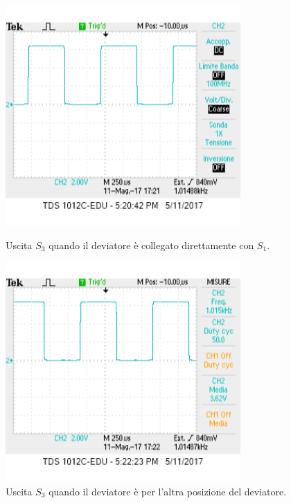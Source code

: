 \documentclass[a4paper,10pt]{article}
\begin{document}
\begin{figure}[H]
\begin{minipage}{0.49\textwidth}
	\centering
	\includegraphics[width=0.8\textwidth]{../grafici/s3_devposA.png}
	\caption{Uscita $S_3$ quando il deviatore è collegato direttamente con $S_1$.}
	\label{fig:3_devposA}
\end{minipage}
\begin{minipage}{0.49\textwidth}
	\centering
	\includegraphics[width=0.8\textwidth]{../grafici/s3_devposB.png}
	\caption{Uscita $S_3$ quando il deviatore è per l'altra posizione del deviatore.}
	\label{fig:3_devposB}
\end{minipage}
\end{figure}
\end{document}
